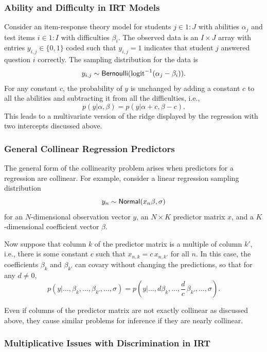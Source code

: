 \subsubsection{Ability and Difficulty in IRT Models}

Consider an item-response theory model for students $j \in 1{:}J$ with
abilities $\alpha_j$ and test items $i \in 1{:}I$ with difficulties
$\beta_i$.  The observed data is an $I \times J$ array with entries
$y_{i,j} \in \{ 0, 1 \}$ coded such that $y_{i,j} = 1$ indicates that
student $j$ answered question $i$ correctly.  The sampling
distribution for the data is
%
\[
y_{i,j} \sim \distro{Bernoulli}(\mbox{logit}^{-1}(\alpha_j - \beta_i)).
\]
%
For any constant $c$, the probability of $y$ is unchanged by adding a
constant $c$ to all the abilities and subtracting it from all the
difficulties, i.e.,
%
\[
p(y | \alpha, \beta)
= 
p(y | \alpha + c, \beta - c).
\]
%
This leads to a multivariate version of the ridge displayed by the
regression with two intercepts discussed above.

\subsubsection{General Collinear Regression Predictors}

The general form of the collinearity problem arises when predictors
for a regression are collinear.  For example, consider a linear
regression sampling distribution
\[
y_n \sim \distro{Normal}(x_n \beta, \sigma)
\]
for an $N$-dimensional observation vector $y$, an $N \times K$ predictor
matrix $x$, and a $K$-dimensional coefficient vector $\beta$.

Now suppose that column $k$ of the predictor matrix is a multiple of
column $k'$, i.e., there is some constant $c$ such that $x_{n,k} = c
\, x_{n,k'}$ for all $n$.  In this case, the coefficients $\beta_k$
and $\beta_{k'}$ can covary without changing the predictions, so that
for any $d \neq 0$,
%
\[
p(y | \ldots, \beta_k, \ldots, \beta_{k'}, \ldots, \sigma)
=
p(y | \ldots, d  \beta_k, \ldots, \frac{d}{c} \, \beta_{k'}, \ldots,
\sigma).
\]

Even if columns of the predictor matrix are not exactly collinear as
discussed above, they cause similar problems for inference if they are
nearly collinear.


\subsubsection{Multiplicative Issues with Discrimination in IRT}

